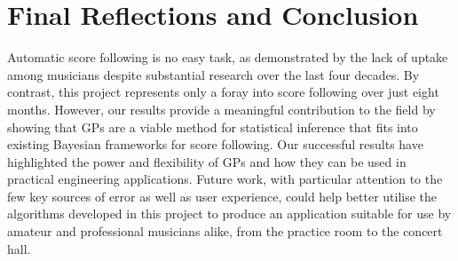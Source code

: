 
\section{Final Reflections and Conclusion}
Automatic score following is no easy task, as demonstrated by the lack of uptake among musicians despite substantial research over the last four decades. By contrast, this project represents only a foray into score following over just eight months. However, our results provide a meaningful contribution to the field by showing that GPs are a viable method for statistical inference that fits into existing Bayesian frameworks for score following. Our successful results have highlighted the power and flexibility of GPs and how they can be used in practical engineering applications. Future work, with particular attention to the few key sources of error as well as user experience, could help better utilise the algorithms developed in this project to produce an application suitable for use by amateur and professional musicians alike, from the practice room to the concert hall. 
   



